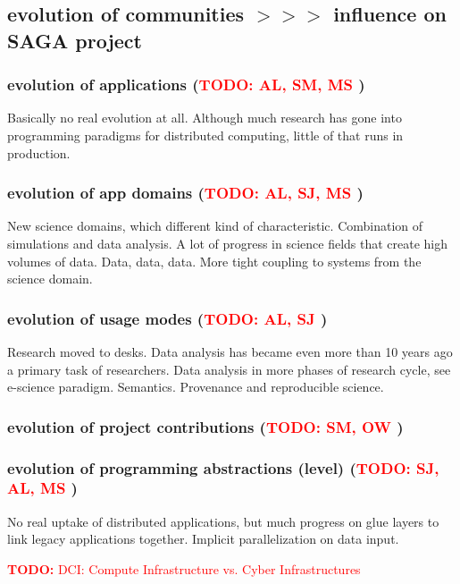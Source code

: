 \documentclass{article}
\newcommand{\B}[1]{\textbf{#1}}
\newcommand{\nind}{\noindent}
\newcommand{\todo}[1]{{\textcolor{red}{\B{TODO:} #1 }}}
\begin{document}
 
 \nind
 \subsection{ evolution of communities  $>>>$ influence on SAGA project}
 \subsubsection{ evolution of applications (\todo{AL, SM, MS})}
 
 Basically no real evolution at all. Although much research has gone
 into programming paradigms for distributed computing, little of that
 runs in production.
 
 \subsubsection{ evolution of app domains (\todo{AL, SJ, MS})}
 
 New science domains, which different kind of characteristic.
 Combination of simulations and data analysis. A lot of progress in
 science fields that create high volumes of data.  Data, data, data.
 More tight coupling to systems from the science domain.
 
 \subsubsection{ evolution of usage modes (\todo{AL, SJ})}
 
 Research moved to desks. Data analysis has became even more than 10
 years ago a primary task of researchers.  Data analysis in more
 phases of research cycle, see e-science paradigm.  Semantics.
 Provenance and reproducible science.
  
 \subsubsection{ evolution of project contributions (\todo{SM, OW})}
 
 \subsubsection{ evolution of programming abstractions (level) (\todo{SJ, AL, MS})}
 
 No real uptake of distributed applications, but much progress on glue
 layers to link legacy applications together.  Implicit
 parallelization on data input.


\newpage

\todo{DCI: Compute Infrastructure vs. Cyber Infrastructures}

\footnotesize


\end{document}
